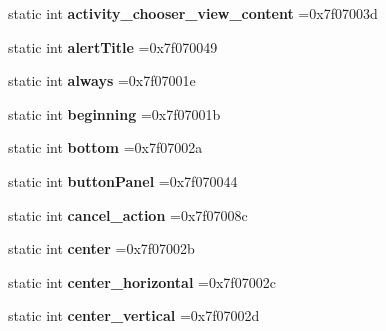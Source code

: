 \begin{DoxyCompactItemize}
static int {\bfseries activity\+\_\+chooser\+\_\+view\+\_\+content} =0x7f07003d
\item 
\mbox{\label{classandroid_1_1support_1_1design_1_1R_1_1id_a891d0ae43276474b2d6f28ff5962d869}} 
static int {\bfseries alert\+Title} =0x7f070049
\item 
\mbox{\label{classandroid_1_1support_1_1design_1_1R_1_1id_a6aa06007c047170b18feeda74d28da6f}} 
static int {\bfseries always} =0x7f07001e
\item 
\mbox{\label{classandroid_1_1support_1_1design_1_1R_1_1id_af8b570410133406bc100986ff69effb9}} 
static int {\bfseries beginning} =0x7f07001b
\item 
\mbox{\label{classandroid_1_1support_1_1design_1_1R_1_1id_a3b0e40092c7d209d49bf9af8e2b5e7b2}} 
static int {\bfseries bottom} =0x7f07002a
\item 
\mbox{\label{classandroid_1_1support_1_1design_1_1R_1_1id_ad65bba046befa7ff435c2cfe09d2a60e}} 
static int {\bfseries button\+Panel} =0x7f070044
\item 
\mbox{\label{classandroid_1_1support_1_1design_1_1R_1_1id_a7e4b3b1b8b677bf596c3c4e6dd633171}} 
static int {\bfseries cancel\+\_\+action} =0x7f07008c
\item 
\mbox{\label{classandroid_1_1support_1_1design_1_1R_1_1id_a385acf6d6cc3a61e72b6e5f2c292ea42}} 
static int {\bfseries center} =0x7f07002b
\item 
\mbox{\label{classandroid_1_1support_1_1design_1_1R_1_1id_af39a745357ac8422b6c989700ae91c86}} 
static int {\bfseries center\+\_\+horizontal} =0x7f07002c
\item 
\mbox{\label{classandroid_1_1support_1_1design_1_1R_1_1id_a5543e48e7d5577a3faeb8786a69cce0f}} 
static int {\bfseries center\+\_\+vertical} =0x7f07002d

\end{DoxyCompactItemize}
